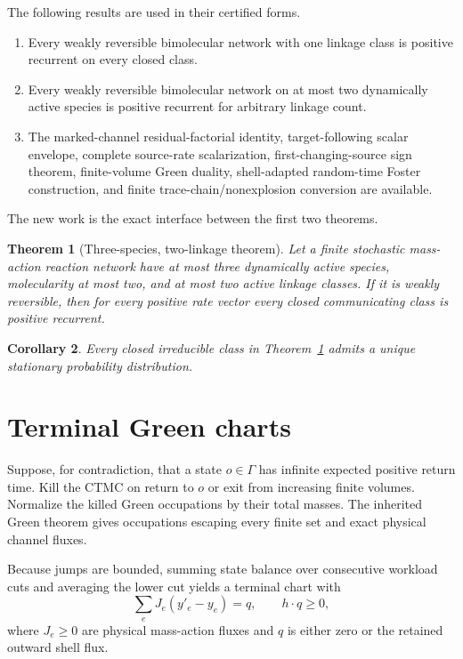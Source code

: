 \documentclass[11pt]{article}
\newtheorem{theorem}{Theorem}[section]
\newtheorem{corollary}[theorem]{Corollary}
\theoremstyle{definition}\newtheorem{definition}[theorem]{Definition}
\theoremstyle{remark}\newtheorem{remark}[theorem]{Remark}
\begin{document}
The following results are used in their certified forms.
\begin{enumerate}
\item Every weakly reversible bimolecular network with one linkage class is positive recurrent on every closed class.
\item Every weakly reversible bimolecular network on at most two dynamically active species is positive recurrent for arbitrary linkage count.
\item The marked-channel residual-factorial identity, target-following scalar envelope, complete source-rate scalarization, first-changing-source sign theorem, finite-volume Green duality, shell-adapted random-time Foster construction, and finite trace-chain/nonexplosion conversion are available.
\end{enumerate}
The new work is the exact interface between the first two theorems.

\begin{theorem}[Three-species, two-linkage theorem]\label{thm:main}
Let a finite stochastic mass-action reaction network have at most three dynamically active species, molecularity at most two, and at most two active linkage classes.  If it is weakly reversible, then for every positive rate vector every closed communicating class is positive recurrent.
\end{theorem}

\begin{corollary}
Every closed irreducible class in Theorem~\ref{thm:main} admits a unique stationary probability distribution.
\end{corollary}

\section{Terminal Green charts}

Suppose, for contradiction, that a state $o\in\Gamma$ has infinite expected positive return time.  Kill the CTMC on return to $o$ or exit from increasing finite volumes.  Normalize the killed Green occupations by their total masses.  The inherited Green theorem gives occupations escaping every finite set and exact physical channel fluxes.

Because jumps are bounded, summing state balance over consecutive workload cuts and averaging the lower cut yields a terminal chart with
\begin{equation}\label{eq:green}
 \sum_eJ_e(y'_e-y_e)=q,
 \qquad h\cdot q\ge0,
\end{equation}
where $J_e\ge0$ are physical mass-action fluxes and $q$ is either zero or the retained outward shell flux.
\end{document}
